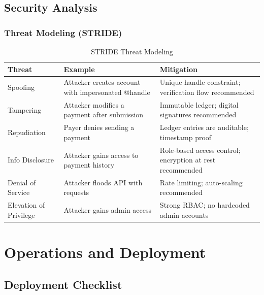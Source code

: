 \documentclass[12pt, a4paper, twoside, openright]{report}
\begin{document}
\section{Security Analysis}

\subsection{Threat Modeling (STRIDE)}

\begin{table}[H]
    \centering
    \begin{tabularx}{\textwidth}{|l|l|l|}
    \hline
    \textbf{Threat} & \textbf{Example} & \textbf{Mitigation} \\
    \hline
    Spoofing & Attacker creates account with impersonated @handle & Unique handle constraint; verification flow recommended \\
    \hline
    Tampering & Attacker modifies a payment after submission & Immutable ledger; digital signatures recommended \\
    \hline
    Repudiation & Payer denies sending a payment & Ledger entries are auditable; timestamp proof \\
    \hline
    Info Disclosure & Attacker gains access to payment history & Role-based access control; encryption at rest recommended \\
    \hline
    Denial of Service & Attacker floods API with requests & Rate limiting; auto-scaling recommended \\
    \hline
    Elevation of Privilege & Attacker gains admin access & Strong RBAC; no hardcoded admin accounts \\
    \hline
    \end{tabularx}
    \caption{STRIDE Threat Modeling}
\end{table}


\chapter{Operations and Deployment}

\section{Deployment Checklist}
\end{document}
